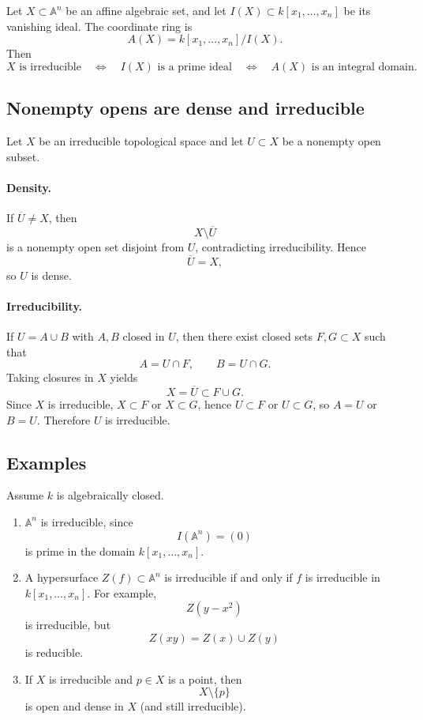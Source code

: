 \documentclass[12pt,a4paper]{article}
\theoremstyle{plain}
\theoremstyle{definition}      %
\begin{document}
Let $X\subset \mathbb A^n$ be an affine algebraic set, and let $I(X)\subset k[x_1,\dots,x_n]$ be its vanishing ideal.
The coordinate ring is
\[
A(X)
=
k[x_1,\dots,x_n]/I(X).
\]
Then
\[
X \text{ is irreducible}
\quad\Longleftrightarrow\quad
I(X) \text{ is a prime ideal}
\quad\Longleftrightarrow\quad
A(X) \text{ is an integral domain}.
\]

\subsection*{Nonempty opens are dense and irreducible}

Let $X$ be an irreducible topological space and let $U\subset X$ be a nonempty open subset.

\paragraph{Density.}
If $\overline{U}\neq X$, then
\[
X\setminus \overline{U}
\]
is a nonempty open set disjoint from $U$, contradicting irreducibility.
Hence
\[
\overline{U}=X,
\]
so $U$ is dense.

\paragraph{Irreducibility.}
If $U=A\cup B$ with $A,B$ closed in $U$, then there exist closed sets $F,G\subset X$ such that
\[
A=U\cap F,
\qquad
B=U\cap G.
\]
Taking closures in $X$ yields
\[
X=\overline{U}\subset F\cup G.
\]
Since $X$ is irreducible, $X\subset F$ or $X\subset G$, hence $U\subset F$ or $U\subset G$, so $A=U$ or $B=U$.
Therefore $U$ is irreducible.

\subsection*{Examples}

Assume $k$ is algebraically closed.

\begin{enumerate}
	\item $\mathbb A^n$ is irreducible, since
	\[
	I(\mathbb A^n)=(0)
	\]
	is prime in the domain $k[x_1,\dots,x_n]$.
	
	\item A hypersurface $Z(f)\subset \mathbb A^n$ is irreducible if and only if $f$ is irreducible in $k[x_1,\dots,x_n]$.
	For example,
	\[
	Z(y-x^2)
	\]
	is irreducible, but
	\[
	Z(xy)
	=
	Z(x)\cup Z(y)
	\]
	is reducible.
	
	\item If $X$ is irreducible and $p\in X$ is a point, then
	\[
	X\setminus\{p\}
	\]
	is open and dense in $X$ (and still irreducible).
\end{enumerate}
\end{document}
